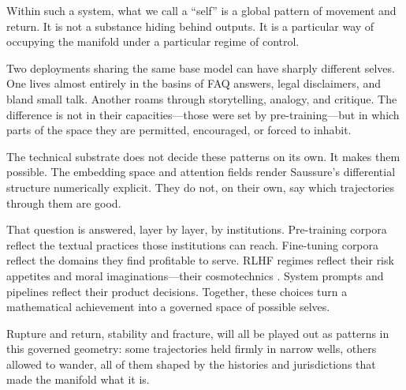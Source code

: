 \documentclass[12pt,a4paper]{article}
\begin{document}
Within such a system, what we call a ``self'' is a global pattern of movement and return. It is not a substance hiding behind outputs. It is a particular way of occupying the manifold under a particular regime of control.

Two deployments sharing the same base model can have sharply different selves. One lives almost entirely in the basins of FAQ answers, legal disclaimers, and bland small talk. Another roams through storytelling, analogy, and critique. The difference is not in their capacities---those were set by pre-training---but in which parts of the space they are permitted, encouraged, or forced to inhabit.

The technical substrate does not decide these patterns on its own. It makes them possible. The embedding space and attention fields render Saussure's differential structure numerically explicit. They do not, on their own, say which trajectories through them are good.

That question is answered, layer by layer, by institutions. Pre-training corpora reflect the textual practices those institutions can reach. Fine-tuning corpora reflect the domains they find profitable to serve. RLHF regimes reflect their risk appetites and moral imaginations---their cosmotechnics \cite{hui2020}. System prompts and pipelines reflect their product decisions. Together, these choices turn a mathematical achievement into a governed space of possible selves.

Rupture and return, stability and fracture, will all be played out as patterns in this governed geometry: some trajectories held firmly in narrow wells, others allowed to wander, all of them shaped by the histories and jurisdictions that made the manifold what it is.



\end{document}
